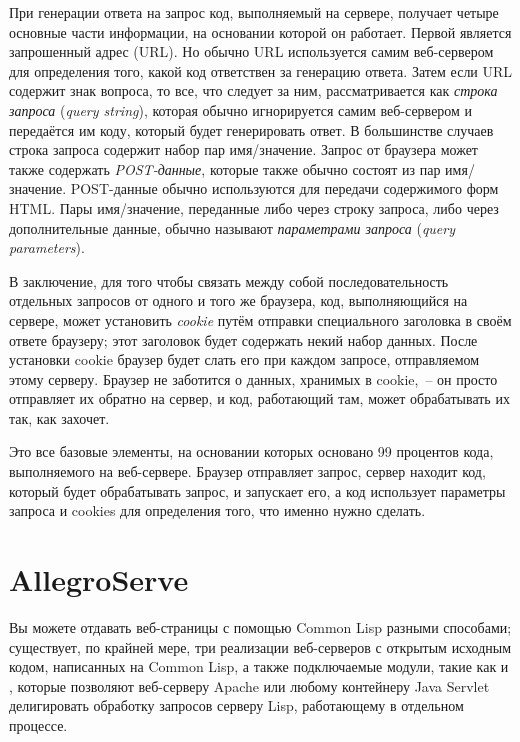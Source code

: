 При генерации ответа на запрос код, выполняемый на сервере, получает четыре основные
части информации, на основании которой он работает. Первой является запрошенный адрес
(URL). Но обычно URL используется самим веб-сервером для определения того, какой код
ответствен за генерацию ответа. Затем если URL содержит знак вопроса, то все, что
следует за ним, рассматривается как \textit{строка запроса} (\textit{query string}),
которая обычно игнорируется самим веб-сервером и передаётся им коду, который будет
генерировать ответ. В большинстве случаев строка запроса содержит набор пар
имя/значение. Запрос от браузера может также содержать \textit{POST-данные}, которые также
обычно состоят из пар имя/значение. POST-данные обычно используются для передачи
содержимого форм HTML. Пары имя/значение, переданные либо через строку запроса, либо через
дополнительные данные, обычно называют \textit{параметрами запроса} (\textit{query
  parameters}).

В заключение, для того чтобы связать между собой последовательность отдельных запросов от
одного и того же браузера, код, выполняющийся на сервере, может установить \textit{cookie}
путём отправки специального заголовка в своём ответе браузеру; этот заголовок будет
содержать некий набор данных. После установки cookie браузер будет слать его при каждом
запросе, отправляемом этому серверу. Браузер не заботится о данных, хранимых в cookie,~--
он просто отправляет их обратно на сервер, и код, работающий там, может обрабатывать их
так, как захочет.

Это все базовые элементы, на основании которых основано 99 процентов кода, выполняемого на
веб-сервере. Браузер отправляет запрос, сервер находит код, который будет обрабатывать
запрос, и запускает его, а код использует параметры запроса и cookies для определения
того, что именно нужно сделать.

\section{AllegroServe}

Вы можете отдавать веб-страницы с помощью Common Lisp разными способами; существует, по
крайней мере, три реализации веб-серверов с открытым исходным кодом, написанных на Common
Lisp, а также подключаемые модули, такие как
 и
, которые позволяют веб-серверу Apache
или любому контейнеру Java Servlet делигировать обработку запросов серверу Lisp,
работающему в отдельном процессе.

